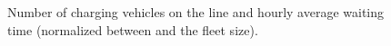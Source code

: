 \documentclass[12pt,a4paper]{article}
\begin{document}
\begin{figure}
\caption{Number of charging vehicles on the line and hourly average waiting time (normalized between and the fleet size).}

\label{compare}
\end{figure}
\end{document}
